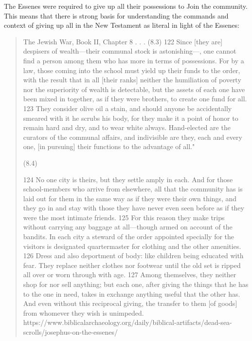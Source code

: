\documentclass[11pt]{article}
\begin{document}
The Essenes were required to give up all their possessions to Join the community. \cite{Essenes common property} This means that there is strong basis for understanding the commands and context of giving up all in the New Testament as literal in light of the Essenes: 
\begin{quote}
The Jewish War, Book II, Chapter 8
. . .
(8.3)
122 Since [they are] despisers of wealth—their communal stock is astonishing—, one cannot find a person among them who has more in terms of possessions. For by a law, those coming into the school must yield up their funds to the order, with the result that in all [their ranks] neither the humiliation of poverty nor the superiority of wealth is detectable, but the assets of each one have been mixed in together, as if they were brothers, to create one fund for all. 123 They consider olive oil a stain, and should anyone be accidentally smeared with it he scrubs his body, for they make it a point of honor to remain hard and dry, and to wear white always. Hand-elected are the curators of the communal affairs, and indivisible are they, each and every one, [in pursuing] their functions to the advantage of all."

(8.4)

124 No one city is theirs, but they settle amply in each. And for those school-members who arrive from elsewhere, all that the community has is laid out for them in the same way as if they were their own things, and they go in and stay with those they have never even seen before as if they were the most intimate friends. 125 For this reason they make trips without carrying any baggage at all—though armed on account of the bandits. In each city a steward of the order appointed specially for the visitors is designated quartermaster for clothing and the other amenities. 126 Dress and also deportment of body: like children being educated with fear. They replace neither clothes nor footwear until the old set is ripped all over or worn through with age. 127 Among themselves, they neither shop for nor sell anything; but each one, after giving the things that he has to the one in need, takes in exchange anything useful that the other has. And even without this reciprocal giving, the transfer to them [of goods] from whomever they wish is unimpeded.\cite{josephus on the essenes}
https://www.biblicalarchaeology.org/daily/biblical-artifacts/dead-sea-scrolls/josephus-on-the-essenes/
\end{quote}
\end{document}
